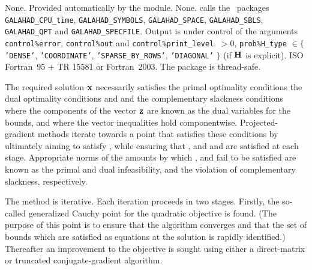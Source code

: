 \documentclass{galahad}
\newcommand{\packagename}{BQP}
\begin{document}
\galgeneral

\galcommon None.
\galworkspace Provided automatically by the module.
\galroutines None. 
\galmodules {\tt \packagename\_solve} calls the \galahad\ packages
{\tt GALAHAD\_CPU\_time},
{\tt GALAHAD\_SY\-M\-BOLS}, \newline
{\tt GALAHAD\_SPACE}, 
{\tt GALAHAD\_SBLS},
{\tt GALAHAD\_QPT} and
{\tt GALAHAD\_SPECFILE}.
\galio Output is under control of the arguments
 {\tt control\%error}, {\tt control\%out} and {\tt control\%print\_level}.
 $> 0$, 
{\tt prob\%H\_type} $\in \{${\tt 'DENSE'}, 
 {\tt 'COORDINATE'}, {\tt 'SPARSE\_BY\_\-ROWS'}, {\tt 'DIAGONAL'} $\}$
(if ${\mathbf{H}}$ is explicit).
\galportability ISO Fortran~95 + TR 15581 or Fortran~2003. 
The package is thread-safe.


\galmethod
The required solution ${\mathbf{x}}$ necessarily satisfies 
the primal optimality conditions
the dual optimality conditions
and 
and the complementary slackness conditions 
where the components of the vector ${\mathbf{z}}$ are known as 
the dual variables for the bounds,
and where the vector inequalities hold componentwise.
Projected-gradient methods iterate towards a point
that satisfies these conditions by ultimately aiming to satisfy
, while ensuring that 
, and  and  are satisfied at each stage. 
Appropriate norms of the amounts by 
which ,  and  fail to be satisfied are known as the
primal and dual infeasibility, and the violation of complementary slackness,
respectively. 

The method is iterative. Each iteration proceeds in two stages.
Firstly, the so-called generalized Cauchy point for the quadratic
objective is found.  (The purpose of this point is to ensure that the
algorithm converges and that the set of bounds which are satisfied as
equations at the solution is rapidly identified.)  Thereafter an
improvement to the objective is sought using either a
direct-matrix or truncated conjugate-gradient algorithm.

\vspace*{1mm}

\galreferences
\vspace*{1mm}
\end{document}
